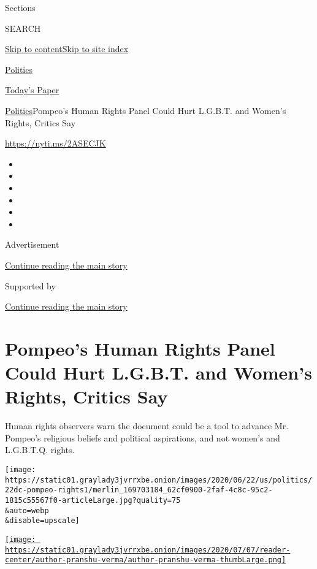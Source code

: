 Sections

SEARCH

\protect\hyperlink{site-content}{Skip to
content}\protect\hyperlink{site-index}{Skip to site index}

\href{https://www.nytimes3xbfgragh.onion/section/politics}{Politics}

\href{https://myaccount.nytimes3xbfgragh.onion/auth/login?response_type=cookie\&client_id=vi}{}

\href{https://www.nytimes3xbfgragh.onion/section/todayspaper}{Today's
Paper}

\href{/section/politics}{Politics}\textbar{}Pompeo's Human Rights Panel
Could Hurt L.G.B.T. and Women's Rights, Critics Say

\url{https://nyti.ms/2ASECJK}

\begin{itemize}
\item
\item
\item
\item
\item
\item
\end{itemize}

Advertisement

\protect\hyperlink{after-top}{Continue reading the main story}

Supported by

\protect\hyperlink{after-sponsor}{Continue reading the main story}

\hypertarget{pompeos-human-rights-panel-could-hurt-lgbt-and-womens-rights-critics-say}{%
\section{Pompeo's Human Rights Panel Could Hurt L.G.B.T. and Women's
Rights, Critics
Say}\label{pompeos-human-rights-panel-could-hurt-lgbt-and-womens-rights-critics-say}}

Human rights observers warn the document could be a tool to advance Mr.
Pompeo's religious beliefs and political aspirations, and not women's
and L.G.B.T.Q. rights.

\texttt{[image: https://static01.graylady3jvrrxbe.onion/images/2020/06/22/us/politics/22dc-pompeo-rights1/merlin\_169703184\_62cf0900-2faf-4c8c-95c2-1815c55567f0-articleLarge.jpg?quality=75\\\&auto=webp\\\&disable=upscale]}

\href{https://www.nytimes3xbfgragh.onion/by/pranshu-verma}{\texttt{[image: https://static01.graylady3jvrrxbe.onion/images/2020/07/07/reader-center/author-pranshu-verma/author-pranshu-verma-thumbLarge.png]}}

